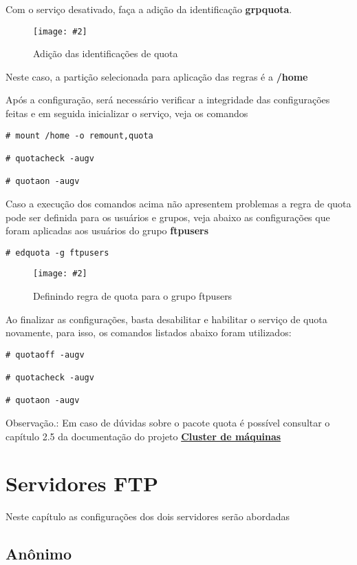 \documentclass[
	12pt,				%
	openright,			%
	twoside,			%
	openany,			%
	a4paper,			%
	chapter=TITLE,		%
	section=TITLE,		%
	subsection=TITLE,	%
	subsubsection=TITLE,%
	english,
	brazil				%
]{abntex2}
\newcommand{\includeImage}[3] {

\begin{figure}[H]
 	 \centering
  		\texttt{[image: \#2]}
  	\caption{#3}
\end{figure}

}
\begin{document}
Com o serviço desativado, faça a adição da identificação \textbf{grpquota}.

\includeImage{0.5}{../imgs/3_quota/0_flag_quota.png}{Adição das identificações de quota}

Neste caso, a partição selecionada para aplicação das regras é a \textbf{/home}

Após a configuração, será necessário verificar a integridade das configurações feitas e em seguida inicializar o serviço, veja os comandos

\begin{lstlisting}
# mount /home -o remount,quota

# quotacheck -augv

# quotaon -augv
\end{lstlisting}

Caso a execução dos comandos acima não apresentem problemas a regra de quota pode ser definida para os usuários e grupos, veja abaixo as configurações que foram aplicadas aos usuários do grupo \textbf{ftpusers}

\begin{lstlisting}
# edquota -g ftpusers
\end{lstlisting}

\includeImage{0.5}{../imgs/3_quota/3_edquota_adminftp.png}{Definindo regra de quota para o grupo ftpusers}

Ao finalizar as configurações, basta desabilitar e habilitar o serviço de quota novamente, para isso, os comandos listados abaixo foram utilizados:

\begin{lstlisting}
# quotaoff -augv

# quotacheck -augv

# quotaon -augv
\end{lstlisting}


Observação.: Em caso de dúvidas sobre o pacote quota é possível consultar o capítulo 2.5 da documentação do projeto \href{https://github.com/M3nin0/turbo-sniffle/blob/master/document.pdf}{\textbf{Cluster de máquinas}}

\section{Servidores FTP}

Neste capítulo as configurações dos dois servidores serão abordadas

\subsection{Anônimo}
\end{document}
